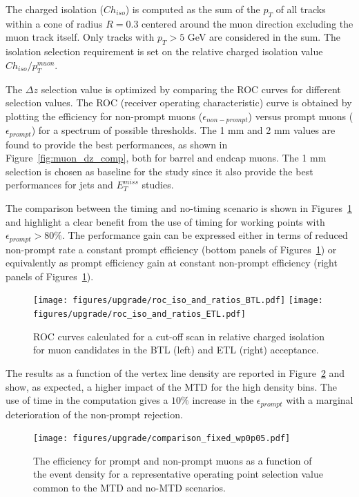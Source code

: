 The charged isolation ($Ch_{iso}$) is computed as the sum of the $p_T$ of all tracks within a cone of radius $R=0.3$ centered
around the muon direction excluding the muon track itself. Only tracks with $p_T > 5$ GeV are considered in the sum.
The isolation selection requirement is set on the relative charged isolation value $Ch_{iso}/p_T^{muon}$.

The $\Delta z$ selection value is optimized by comparing the ROC curves for different selection values.
The ROC (receiver operating characteristic) curve is obtained by plotting the efficiency for
non-prompt muons ($\epsilon_{non-prompt}$) versus prompt muons ($\epsilon_{prompt}$) for a spectrum of possible
\relChIso thresholds.
The 1 mm and 2 mm values are found to provide the best performances, as shown in Figure~\ref{fig:muon_dz_comp}, both
for barrel and endcap muons. The 1 mm selection is chosen as baseline for the study since it also provide the
best performances for jets and $E_T^{miss}$ studies.


The comparison between the timing and no-timing scenario is shown in Figures~\ref{fig:roc_iso_ratio} and highlight
a clear benefit from the use of timing for working points with $\epsilon_{prompt}> 80\%$.
The performance gain can be expressed either in terms of reduced non-prompt rate a constant prompt efficiency
(bottom panels of Figures~\ref{fig:roc_iso_ratio}) or equivalently as prompt efficiency gain at constant non-prompt
efficiency (right panels of Figures~\ref{fig:roc_iso_ratio}).

\begin{figure}[h!]
  \centering
  \texttt{[image: figures/upgrade/roc\_iso\_and\_ratios\_BTL.pdf]}
  \texttt{[image: figures/upgrade/roc\_iso\_and\_ratios\_ETL.pdf]}
  \caption{ROC curves calculated for a cut-off scan in relative charged isolation for muon candidates
    in the BTL (left) and ETL (right) acceptance.}
  \label{fig:roc_iso_ratio}
\end{figure}

The results as a function of the vertex line density are reported in Figure~\ref{fig:muon_iso_vs_density} and show,
as expected, a higher impact of the MTD for the high density bins. The use of time in the \relChIso computation
gives a $10\%$ increase in the $\epsilon_{prompt}$ with a marginal deterioration of the non-prompt rejection.

\begin{figure}
  \centering
  \texttt{[image: figures/upgrade/comparison\_fixed\_wp0p05.pdf]}
  \caption{The efficiency for prompt and non-prompt muons as a function of the event density
    for a representative operating point selection value common to the MTD and no-MTD scenarios.}
  \label{fig:muon_iso_vs_density}
\end{figure}

